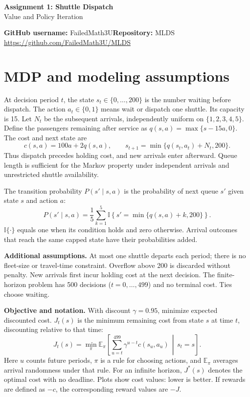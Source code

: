 \documentclass[11pt,letterpaper]{article}
\begin{document}
\begin{center}{\Large\bfseries Assignment 1: Shuttle Dispatch}\\[3pt]
Value and Policy Iteration\end{center}
\textbf{GitHub username:} FailedMath3U\quad\textbf{Repository:} MLDS\\
\url{https://github.com/FailedMath3U/MLDS}

\section{MDP and modeling assumptions}
At decision period $t$, the state $s_t\in\{0,\ldots,200\}$ is the number waiting before dispatch. The action $a_t\in\{0,1\}$ means wait or dispatch one shuttle. Its capacity is 15. Let $N_t$ be the subsequent arrivals, independently uniform on $\{1,2,3,4,5\}$. Define the passengers remaining after service as $q(s,a)=\max\{s-15a,0\}$. The cost and next state are
\[
c(s,a)=100a+2q(s,a),\qquad
s_{t+1}=\min\{q(s_t,a_t)+N_t,200\}.
\]
Thus dispatch precedes holding cost, and new arrivals enter afterward. Queue length is sufficient for the Markov property under independent arrivals and unrestricted shuttle availability.

The transition probability $P(s'\mid s,a)$ is the probability of next queue $s'$ given state $s$ and action $a$:
\[
P(s'\mid s,a)=\frac15\sum_{k=1}^{5}
\mathbb{I}\!\left\{s'=\min\{q(s,a)+k,200\}\right\}.
\]
$\mathbb{I}\{\cdot\}$ equals one when its condition holds and zero otherwise. Arrival outcomes that reach the same capped state have their probabilities added.

\textbf{Additional assumptions.} At most one shuttle departs each period; there is no fleet-size or travel-time constraint. Overflow above 200 is discarded without penalty. New arrivals first incur holding cost at the next decision. The finite-horizon problem has 500 decisions ($t=0,\ldots,499$) and no terminal cost. Ties choose waiting.

\textbf{Objective and notation.} With discount $\gamma=0.95$, minimize expected discounted cost. $J_t(s)$ is the minimum remaining cost from state $s$ at time $t$, discounting relative to that time:
\[
J_t(s)=\min_\pi\mathbb E_\pi\!\left[
\sum_{u=t}^{499}\gamma^{u-t}c(s_u,a_u)\,\middle|\,s_t=s\right].
\]
Here $u$ counts future periods, $\pi$ is a rule for choosing actions, and $\mathbb E_\pi$ averages arrival randomness under that rule. For an infinite horizon, $J^*(s)$ denotes the optimal cost with no deadline. Plots show cost values: lower is better. If rewards are defined as $-c$, the corresponding reward values are $-J$.
\end{document}
